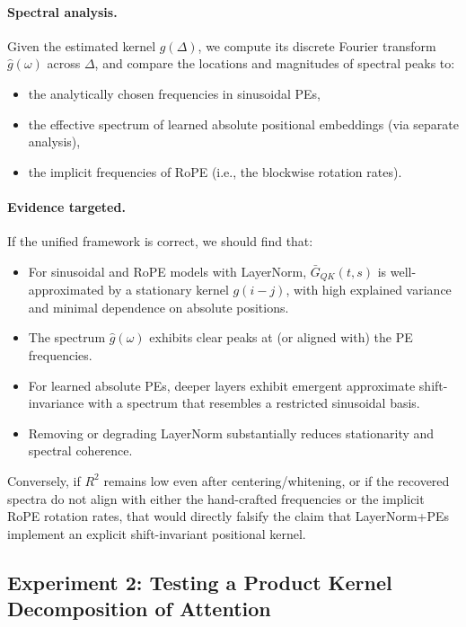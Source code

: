 \documentclass[11pt]{article}
\theoremstyle{definition}
\begin{document}
\paragraph{Spectral analysis.}
Given the estimated kernel \(g(\Delta)\), we compute its discrete Fourier transform \(\hat{g}(\omega)\) across \(\Delta\), and compare the locations and magnitudes of spectral peaks to:
\begin{itemize}
    \item the analytically chosen frequencies in sinusoidal PEs,
    \item the effective spectrum of learned absolute positional embeddings (via separate analysis),
    \item the implicit frequencies of RoPE (i.e., the blockwise rotation rates).
\end{itemize}

\paragraph{Evidence targeted.}
If the unified framework is correct, we should find that:
\begin{itemize}
    \item For sinusoidal and RoPE models with LayerNorm, \(\bar{G}_{QK}(t,s)\) is well-approximated by a stationary kernel \(g(i-j)\), with high explained variance and minimal dependence on absolute positions.
    \item The spectrum \(\hat{g}(\omega)\) exhibits clear peaks at (or aligned with) the PE frequencies.
    \item For learned absolute PEs, deeper layers exhibit emergent approximate shift-invariance with a spectrum that resembles a restricted sinusoidal basis.
    \item Removing or degrading LayerNorm substantially reduces stationarity and spectral coherence.
\end{itemize}
Conversely, if \(R^2\) remains low even after centering/whitening, or if the recovered spectra do not align with either the hand-crafted frequencies or the implicit RoPE rotation rates, that would directly falsify the claim that LayerNorm+PEs implement an explicit shift-invariant positional kernel.

\subsection{Experiment 2: Testing a Product Kernel Decomposition of Attention}
\label{sec:exp-product-kernel}
\end{document}
